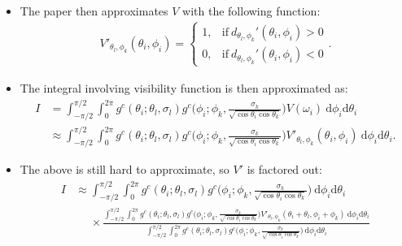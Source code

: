 \documentclass[10pt]{article}
\newcommand{\dee}{\mathrm{d}}
\begin{document}
\begin{itemize}
    \item The paper then approximates $V$ with the following function:
    \begin{align*}
      V'_{\theta_l, \phi_k}(\theta_i, \phi_i) = \begin{cases}
        1, & \mathrm{if}\ d_{\theta_l,\phi_k}'(\theta_i, \phi_i) > 0 \\
        0, & \mathrm{if}\ d_{\theta_l,\phi_k}'(\theta_i, \phi_i) < 0
      \end{cases}.
    \end{align*}

    \item The integral involving visibility function is then approximated as:
    \begin{align*}
      I &= \int_{-\pi/2}^{\pi/2} \int_{0}^{2\pi} g^c(\theta_i;\theta_l,\sigma_l) g^c\bigg(\phi_i; \phi_k, \frac{\sigma_k}{\sqrt{\cos\theta_i\cos\theta_k}}\bigg) V(\omega_i)\ \dee\phi_i \dee\theta_i \\
      &\approx \int_{-\pi/2}^{\pi/2} \int_{0}^{2\pi} g^c(\theta_i;\theta_l,\sigma_l) g^c\bigg(\phi_i; \phi_k, \frac{\sigma_k}{\sqrt{\cos\theta_i\cos\theta_k}}\bigg) V'_{\theta_l,\phi_k}(\theta_i, \phi_i)\ \dee\phi_i \dee\theta_i.
    \end{align*}

    \item The above is still hard to approximate, so $V'$ is factored out:
    \begin{align*}
      I 
      &\approx \int_{-\pi/2}^{\pi/2} \int_{0}^{2\pi} g^c(\theta_i;\theta_l,\sigma_l) g^c\bigg(\phi_i; \phi_k, \frac{\sigma_k}{\sqrt{\cos\theta_i\cos\theta_k}}\bigg)\ \dee\phi_i \dee\theta_i\\
      &\phantom{\approx} \times \frac{\int_{-\pi/2}^{\pi/2} \int_{0}^{2\pi} g^c(\theta_i;\theta_l,\sigma_l) g^c\big(\phi_i; \phi_k, \frac{\sigma_k}{\sqrt{\cos\theta_i\cos\theta_k}}\big) V'_{\theta_l,\phi_k}(\theta_i + \theta_l, \phi_i + \phi_k)\ \dee\phi_i \dee\theta_i}{\int_{-\pi/2}^{\pi/2} \int_{0}^{2\pi} g^c(\theta_i;\theta_l,\sigma_l) g^c\big(\phi_i; \phi_k, \frac{\sigma_k}{\sqrt{\cos\theta_i\cos\theta_k}}\big)\ \dee\phi_i \dee\theta_i}
    \end{align*}


\end{itemize}
\end{document}
